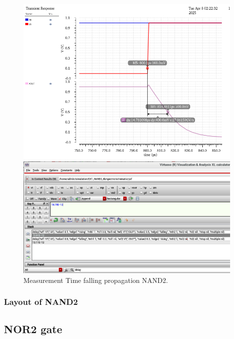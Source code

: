 \begin{figure}[H]
	\begin{minipage}{0.5\linewidth}
		\includegraphics[width=\linewidth]{section/EX1/NAND/EX1_NAND2_Tpdf_Waveform.png}
	\end{minipage}
	\begin{minipage}{0.5\linewidth}
		\includegraphics[width=\linewidth]{section/EX1/NAND/EX1_NAND2_Tpdf_Cal.png}
	\end{minipage}
	\caption{Measurement Time falling propagation NAND2.}
\end{figure}

\subsubsection{Layout of NAND2}
\subsection{NOR2 gate}

